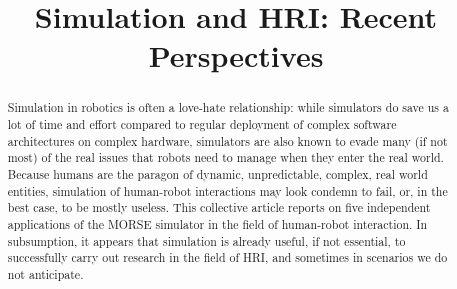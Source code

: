 \documentclass[conference]{IEEEtran}
\begin{document}
\title{Simulation and HRI: Recent Perspectives}

\author{}


\maketitle

\begin{abstract}

Simulation in robotics is often a love-hate relationship: while simulators do
save us a lot of time and effort compared to regular deployment of complex
software architectures on complex hardware, simulators are also known to evade
many (if not most) of the real issues that robots need to manage when they enter
the real world.  Because humans are the paragon of dynamic, unpredictable,
complex, real world entities, simulation of human-robot interactions may look
condemn to fail, or, in the best case, to be mostly useless. This collective
article reports on five independent applications of the MORSE simulator in the
field of human-robot interaction. In subsumption, it appears that simulation is 
already useful, if not essential, to successfully carry out research in the field 
of HRI, and sometimes in scenarios we do not anticipate.

\end{abstract}
\end{document}
